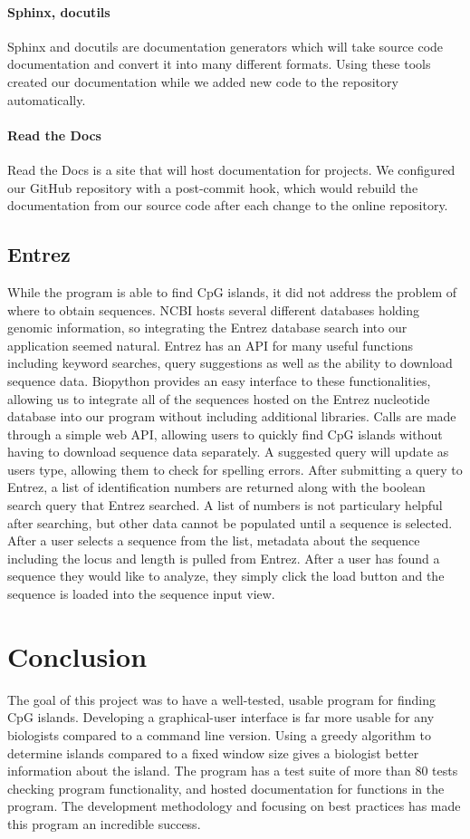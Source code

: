 \documentclass{bioinfo}
\begin{document}
\paragraph{Sphinx, docutils\textcolon}
Sphinx and docutils are documentation generators which will take source code documentation and convert it into many different formats. Using these tools created our documentation while we added new code to the repository automatically.

\paragraph{Read the Docs\textcolon} 
Read the Docs is a site that will host documentation for projects. We configured our GitHub repository with a post-commit hook, which would rebuild the documentation from our source code after each change to the online repository.
      
\subsection{Entrez}

While the program is able to find CpG islands, it did not address the problem of where to obtain sequences. NCBI hosts several different databases holding genomic information, so integrating the Entrez database search into our application seemed natural. Entrez has an API for many useful functions including keyword searches, query suggestions as well as the ability to download sequence data. Biopython provides an easy interface to these functionalities, allowing us to integrate all of the sequences hosted on the Entrez nucleotide database into our program without including additional libraries. Calls are made through a simple web API, allowing users to quickly find CpG islands without having to download sequence data separately. A suggested query will update as users type, allowing them to check for spelling errors. After submitting a query to Entrez, a list of identification numbers are returned along with the boolean search query that Entrez searched. A list of numbers is not particulary helpful after searching, but other data cannot be populated until a sequence is selected. After a user selects a sequence from the list, metadata about the sequence including the locus and length is pulled from Entrez. After a user has found a sequence they would like to analyze, they simply click the load button and the sequence is loaded into the sequence input view.

\section{Conclusion}
The goal of this project was to have a well-tested, usable program for finding CpG islands. Developing a graphical-user interface is far more usable for any biologists compared to a command line version. Using a greedy algorithm to determine islands compared to a fixed window size gives a biologist better information about the island. The program has a test suite of more than 80 tests checking program functionality, and hosted documentation for functions in the program. The development methodology and focusing on best practices has made this program an incredible success.

% 
% 

% 
% 
% 
% 
% 

\end{document}
